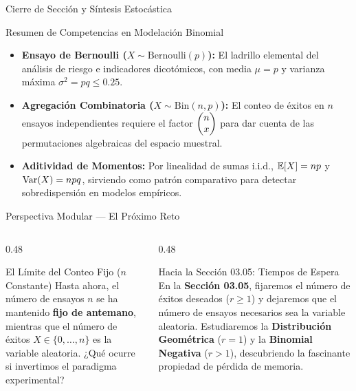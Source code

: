 \documentclass[10pt, aspectratio=169]{beamer}
\begin{document}
\begin{frame}{Cierre de Sección y Síntesis Estocástica}
  \begin{block}{Resumen de Competencias en Modelación Binomial}
    \footnotesize
    \begin{itemize}\itemsep=0.1cm
      \item \textbf{Ensayo de Bernoulli ($X \sim \text{Bernoulli}(p)$):} El ladrillo elemental del análisis de riesgo e indicadores dicotómicos, con media $\mu = p$ y varianza máxima $\sigma^2 = pq \le 0.25$.
      \item \textbf{Agregación Combinatoria ($X \sim \text{Bin}(n, p)$):} El conteo de éxitos en $n$ ensayos independientes requiere el factor $\begin{pmatrix} n \\ x \end{pmatrix}$ para dar cuenta de las permutaciones algebraicas del espacio muestral.
      \item \textbf{Aditividad de Momentos:} Por linealidad de sumas i.i.d., $\mathbb{E}[X] = np$ y $\operatorname{Var}(X) = npq$, sirviendo como patrón comparativo para detectar sobredispersión en modelos empíricos.
    \end{itemize}
  \end{block}
\end{frame}

\begin{frame}{Perspectiva Modular — El Próximo Reto}
  \begin{columns}[T]
    \begin{column}{0.48\textwidth}
      \begin{block}{El Límite del Conteo Fijo ($n$ Constante)}
        \footnotesize
        Hasta ahora, el número de ensayos $n$ se ha mantenido \textbf{fijo de antemano}, mientras que el número de éxitos $X \in \{0, \dots, n\}$ es la variable aleatoria. ¿Qué ocurre si invertimos el paradigma experimental?
      \end{block}
    \end{column}
    \begin{column}{0.48\textwidth}
      \pause
      \begin{alertblock}{Hacia la Sección 03.05: Tiempos de Espera}
        \footnotesize
        En la \textbf{Sección 03.05}, fijaremos el número de éxitos deseados ($r \ge 1$) y dejaremos que el número de ensayos necesarios sea la variable aleatoria. Estudiaremos la \textbf{Distribución Geométrica} ($r=1$) y la \textbf{Binomial Negativa} ($r>1$), descubriendo la fascinante propiedad de pérdida de memoria.
      \end{alertblock}
    \end{column}
  \end{columns}
\end{frame}
\end{document}
